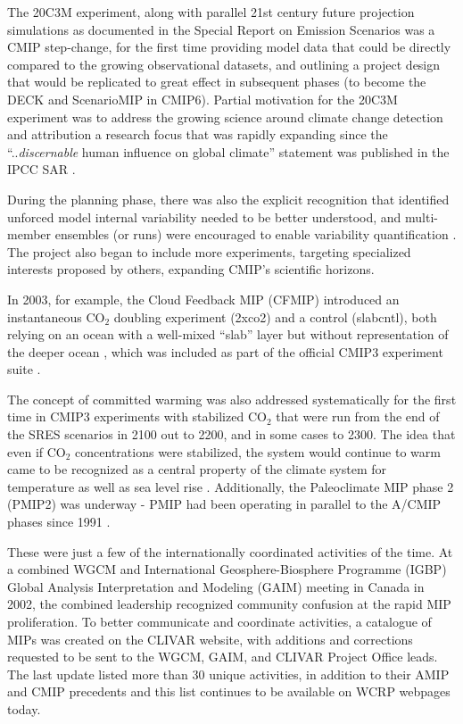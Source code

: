 \documentclass[manuscript]{copernicus}
\begin{document}
The 20C3M experiment, along with parallel 21st century future projection simulations as documented in the Special Report on Emission Scenarios \citep[SRES 2000-2100;][]{nakicenovic_summary_2000} was a CMIP step-change, for the first time providing model data that could be directly compared to the growing observational datasets, and outlining a project design that would be replicated to great effect in subsequent phases (to become the DECK and ScenarioMIP in CMIP6). Partial motivation for the 20C3M experiment was to address the growing science around climate change detection and attribution \citep[DandA; e.g.,][]{santer_detection_1996-1,hegerl_20c3m_2003} a research focus that was rapidly expanding since the ``..\emph{discernable} human influence on global climate'' statement was published in the IPCC SAR \citep{santer_detection_1996}.

During the planning phase, there was also the explicit recognition that identified unforced model internal variability needed to be better understood, and multi-member ensembles (or runs) were encouraged to enable variability quantification \citep{meehl_wcrp_2007}. The project also began to include more experiments, targeting specialized interests proposed by others, expanding CMIP's scientific horizons.

In 2003, for example, the Cloud Feedback MIP (CFMIP) introduced an instantaneous CO$_{2}$ doubling experiment (2xco2) and a control (slabcntl), both relying on an ocean with a well-mixed ``slab'' layer but without representation of the deeper ocean \citep{manabe_co2-climate_1979}, which was included as part of the official CMIP3 experiment suite \citep[see also \autoref{tab:tabAppA1-MIPExperiments};][]{mcavaney_cloud_2003,webb_cloud_2017}.

The concept of committed warming was also addressed systematically for the first time in CMIP3 experiments with stabilized CO$_{2}$ that were run from the end of the SRES scenarios in 2100 out to 2200, and in some cases to 2300. The idea that even if CO$_{2}$ concentrations were stabilized, the system would continue to warm came to be recognized as a central property of the climate system for temperature as well as sea level rise \citep{meehl_how_2005}. Additionally, the Paleoclimate MIP phase 2 (PMIP2) was underway - PMIP had been operating in parallel to the A/CMIP phases since 1991 \citep{villwock_6th_2003,braconnot_paleoclimate_2011,joussame_pmip_2021}.

These were just a few of the internationally coordinated activities of the time. At a combined WGCM and International Geosphere-Biosphere Programme (IGBP) Global Analysis Interpretation and Modeling (GAIM) meeting in Canada in 2002, the combined leadership recognized community confusion at the rapid MIP proliferation. To better communicate and coordinate activities, a catalogue of MIPs was created on the CLIVAR website, with additions and corrections requested to be sent to the WGCM, GAIM, and CLIVAR Project Office leads. The last update listed more than 30 unique activities, in addition to their AMIP and CMIP precedents \citep{meehl_catalogue_2003} and this list continues to be available on WCRP webpages today.
\end{document}
